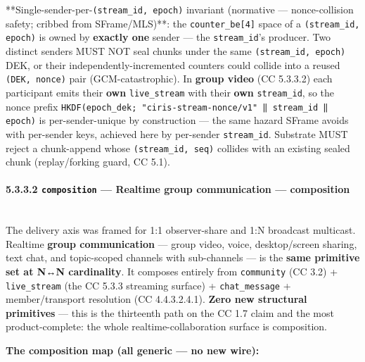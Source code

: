 \documentclass[11pt]{article}
\begin{document}
**Single-sender-per-\texttt{(stream\_id, epoch)} invariant (normative — nonce-collision safety; cribbed from SFrame/MLS)**: the \texttt{counter\_be[4]} space of a \texttt{(stream\_id, epoch)} is owned by \textbf{exactly one} sender — the \texttt{stream\_id}'s producer. Two distinct senders MUST NOT seal chunks under the same \texttt{(stream\_id, epoch)} DEK, or their independently-incremented counters could collide into a reused \texttt{(DEK, nonce)} pair (GCM-catastrophic). In \textbf{group video} (CC 5.3.3.2) each participant emits their \textbf{own} \texttt{live\_stream} with their \textbf{own} \texttt{stream\_id}, so the nonce prefix \texttt{HKDF(epoch\_dek; "ciris-stream-nonce/v1" ‖ stream\_id ‖ epoch)} is per-sender-unique by construction — the same hazard SFrame avoids with per-sender keys, achieved here by per-sender \texttt{stream\_id}. Substrate MUST reject a chunk-append whose \texttt{(stream\_id, seq)} collides with an existing sealed chunk (replay/forking guard, CC 5.1).


\paragraph{5.3.3.2 \texttt{composition} — Realtime group communication — composition}\mbox{}\\


The delivery axis was framed for 1:1 observer-share and 1:N broadcast multicast. Realtime \textbf{group communication} — group video, voice, desktop/screen sharing, text chat, and topic-scoped channels with sub-channels — is the \textbf{same primitive set at N↔N cardinality}. It composes entirely from \texttt{community} (CC 3.2) + \texttt{live\_stream} (the CC 5.3.3 streaming surface) + \texttt{chat\_message} + member/transport resolution (CC 4.4.3.2.4.1). \textbf{Zero new structural primitives} — this is the thirteenth path on the CC 1.7 claim and the most product-complete: the whole realtime-collaboration surface is composition.


\textbf{The composition map (all generic — no new wire):}
\end{document}

